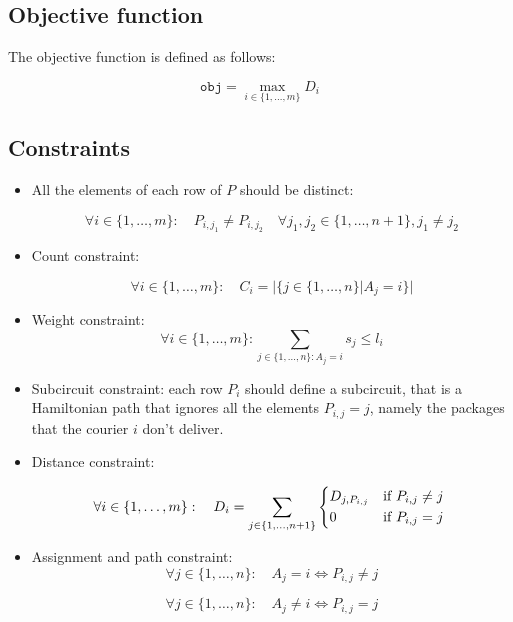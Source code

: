 \subsection{Objective function}
The objective function is defined as follows:

\[ \texttt{obj} = \max_{i \in \{1, \dots, m\}} D_i  \]

\subsection{Constraints}

\begin{itemize}
    \item All the elements of each row of $P$ should be distinct:

    \begin{equation}
        \forall i \in \{1, \dots, m\}: \quad P_{i,j_1} \neq P_{i,j_2} \quad \forall j_1,j_2 \in \{1, \dots, n+1\}, j_1 \neq j_2 
    \end{equation}

    \item Count constraint: 

    \begin{equation}
        \forall i \in \{ 1, \dots, m \}: \quad C_i = | \{ j \in \{1, \dots, n\} | A_j = i \}|
    \end{equation}


    \item Weight constraint: 
    \begin{equation}
        \forall i \in \{ 1, \dots, m \}: \sum_{j \in \{1, \dots, n\}: A_j = i} s_j \leq l_i 
    \end{equation}

    \item Subcircuit constraint: each row $P_i$ should define a subcircuit, that is a Hamiltonian path that ignores all the elements $P_{i,j} = j$, namely the packages that the courier $i$ don't deliver.

    \item Distance constraint:

    \begin{equation}
        \forall i \in \{1, \dots, m\}: \quad D_i = \sum_{j \in \{1, \dots, n+1\}} \begin{cases*}
                    D_{j,P_{i,j}} & if  $P_{i,j} \neq j$  \\
                    0 & if $P_{i,j} = j$
                 \end{cases*}
    \end{equation}

    \item Assignment and path constraint:
    \begin{equation}
        \forall j \in \{1, \dots, n\}: \quad A_j = i \Longleftrightarrow P_{i,j} \neq j
    \end{equation}

    \begin{equation}
        \forall j \in \{1, \dots, n\}: \quad A_j \neq i \Longleftrightarrow P_{i,j} = j
    \end{equation}
\end{itemize}

